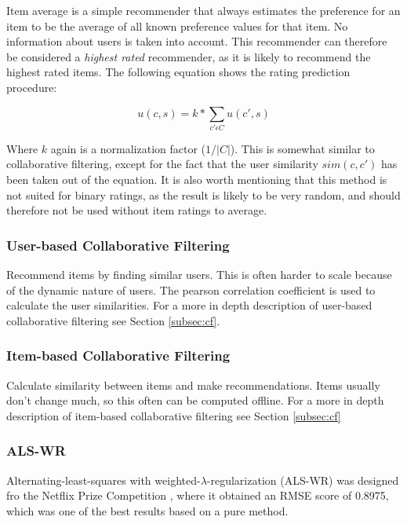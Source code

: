 Item average is a simple recommender that always estimates the preference for an item to be the average of all known preference values for that item. No information about users is taken into account. This recommender can therefore be considered a \emph{highest rated} recommender, as it is likely to recommend the highest rated items. The following equation shows the rating prediction procedure:

\begin{equation}
\label{equation:itemaverageratingprediction}
u(c,s) = k * \sum_{c' \epsilon C} u(c',s)
\end{equation}

Where $k$ again is a normalization factor ($1/|C|$). This is somewhat similar to collaborative filtering, except for the fact that the user similarity $sim(c, c')$ has been taken out of the equation. It is also worth mentioning that this method is not suited for binary ratings, as the result is likely to be very random, and should therefore not be used without item ratings to average.

\subsubsection{User-based Collaborative Filtering}

Recommend items by finding similar users. This is often harder to scale because of the dynamic nature of users. The pearson correlation coefficient is used to calculate the user similarities. For a more in depth description of user-based collaborative filtering see Section \ref{subsec:cf}.

\subsubsection{Item-based Collaborative Filtering}

Calculate similarity between items and make recommendations. Items usually don't change much, so this often can be computed offline. For a more in depth description of item-based collaborative filtering see Section \ref{subsec:cf}

\subsubsection{ALS-WR}

Alternating-least-squares with weighted-$\lambda$-regularization (ALS-WR) was designed fro the Netflix Prize Competition \cite{Netflix}, where it obtained an RMSE score of 0.8975, which was one of the best results based on a pure method.

